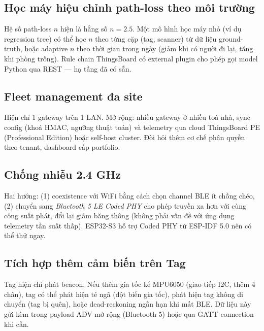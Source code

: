 \subsection{Học máy hiệu chỉnh path-loss theo môi trường}

Hệ số path-loss $n$ hiện là hằng số $n = 2.5$. Một mô hình học máy nhỏ (ví dụ regression tree) có thể học $n$ theo từng cặp (tag, scanner) từ dữ liệu ground-truth, hoặc adaptive $n$ theo thời gian trong ngày (giảm khi có người đi lại, tăng khi phòng trống). Rule chain ThingsBoard có external plugin cho phép gọi model Python qua REST — hạ tầng đã có sẵn.

\subsection{Fleet management đa site}

Hiện chỉ 1 gateway trên 1 LAN. Mở rộng: nhiều gateway ở nhiều toà nhà, sync config (khoá HMAC, ngưỡng thuật toán) và telemetry qua cloud ThingsBoard PE (Professional Edition) hoặc self-host cluster. Đòi hỏi thêm cơ chế phân quyền theo tenant, dashboard cấp portfolio.

\subsection{Chống nhiễu 2.4 GHz}

Hai hướng: (1) coexistence với WiFi bằng cách chọn channel BLE ít chồng chéo, (2) chuyển sang \textit{Bluetooth 5 LE Coded PHY} cho phép truyền xa hơn với cùng công suất phát, đổi lại giảm băng thông (không phải vấn đề với ứng dụng telemetry tần suất thấp). ESP32-S3 hỗ trợ Coded PHY từ ESP-IDF 5.0 nên có thể thử ngay.

\subsection{Tích hợp thêm cảm biến trên Tag}

Tag hiện chỉ phát beacon. Nếu thêm gia tốc kế MPU6050 (giao tiếp I2C, thêm 4 chân), tag có thể phát hiện té ngã (đột biến gia tốc), phát hiện tag không di chuyển (tag bị quên), hoặc dead-reckoning ngắn hạn khi mất BLE. Dữ liệu này gửi kèm trong payload ADV mở rộng (Bluetooth 5) hoặc qua GATT connection khi cần.

